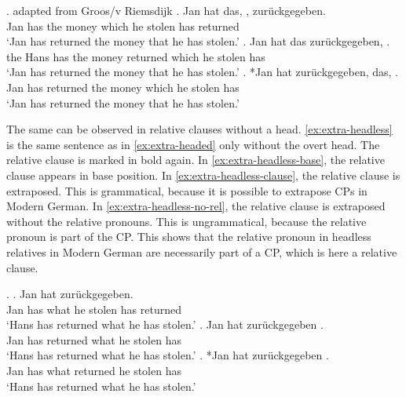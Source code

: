 \ex. \label{ex:extra-headed} adapted from Groos/v Riemsdijk
\ag. Jan hat das,    , zurückgegeben.\\
Jan has the money which he stolen has returned\\
\glt `Jan has returned the money that he has stolen.'\label{ex:extra-headed-base}
\bg. Jan hat das zurückgegeben,    .\\
the Hans has the money returned which he stolen has\\
\glt `Jan has returned the money that he has stolen.'\label{ex:extra-headed-only-clause}
\cg. *Jan hat zurückgegeben, das,    .\\
Jan has returned the money which he stolen has\\
\glt `Jan has returned the money that he has stolen.'\label{ex:extra-headed-head-clause}

The same can be observed in relative clauses without a head. \ref{ex:extra-headless} is the same sentence as in \ref{ex:extra-headed} only without the overt head. The relative clause is marked in bold again.
In \ref{ex:extra-headless-base}, the relative clause appears in base position. In \ref{ex:extra-headless-clause}, the relative clause is extraposed. This is grammatical, because it is possible to extrapose CPs in Modern German. In \ref{ex:extra-headless-no-rel}, the relative clause is extraposed without the relative pronouns. This is ungrammatical, because the relative pronoun is part of the CP.
This shows that the relative pronoun in headless relatives in Modern German are necessarily part of a CP, which is here a relative clause.

\ex.\label{ex:extra-headless}
\ag. Jan hat     zurückgegeben.\\
Jan has what he stolen has returned\\
`Hans has returned what he has stolen.' \citet[185]{groos1981}\label{ex:extra-headless-base}
\bg. Jan hat zurückgegeben    .\\
Jan has returned what he stolen has\\
`Hans has returned what he has stolen.' \citet[185]{groos1981}\label{ex:extra-headless-clause}
\bg. *Jan hat  zurückgegeben   .\\
Jan has what returned he stolen has\\
`Hans has returned what he has stolen.' \citet[185]{groos1981}\label{ex:extra-headless-no-rel}

